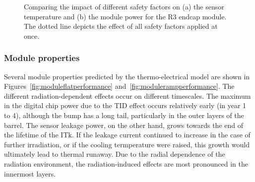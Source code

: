 \begin{figure}[ht]
\centering
{}\quad\quad
{}
\caption{Comparing the impact of different safety factors on (a) the sensor temperature and
(b) the module power for the R3 endcap module. The dotted line depicts the effect of all safety
factors applied at once.}
\label{fig:safety_factors}
\end{figure}

\subsubsection{Module properties}

Several module properties predicted by the thermo-electrical model are shown in Figures~\ref{fig:moduleflatperformance} and~\ref{fig:modulerampperformance}. The different radiation-dependent effects occur on different timescales. The maximum in the digital chip power due to the TID effect occurs relatively early (in year 1 to 4), although the bump has a long tail, particularly in the outer layers of the barrel. The sensor leakage power, on the other hand, grows towards the end of the lifetime of the ITk. If the leakage current continued to increase in the case of further irradiation, or if the cooling termperature were raised, this growth would ultimately lead to thermal runaway. Due to the radial dependence of the radiation environment, the radiation-induced effects are most pronounced in the innermost layers.

